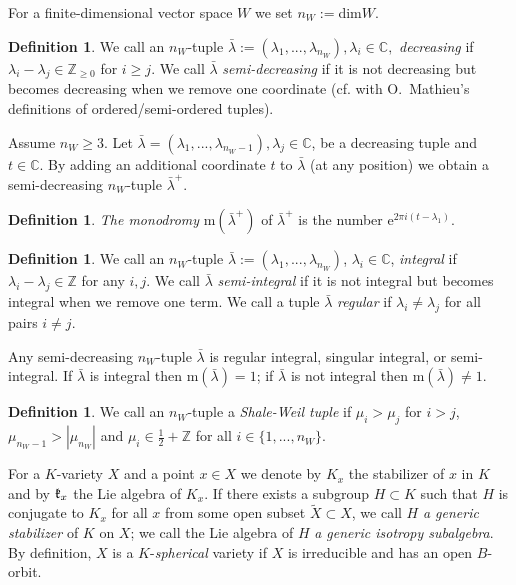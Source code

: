 \documentclass[12pt]{amsart}
\theoremstyle{definition}\newtheorem{theorem}{Theorem}[section]
\theoremstyle{definition}\newtheorem{definition}[proposition]{Definition}
\theoremstyle{remark}\newtheorem{example}[proposition]{Example}
\begin{document}
For a finite-dimensional vector space $W$ we set $n_W:=$dim$W$.
\begin{definition} We call an $n_W$-tuple $\bar\lambda:=(\lambda_1,..., \lambda_{n_W}), \lambda_i\in\mathbb C,$ {\it decreasing} if $\lambda_i-\lambda_j\in\mathbb Z_{\ge0}$ for $i\ge j$. We call $\bar\lambda$ {\it semi-decreasing} if it is not decreasing but becomes decreasing when we remove one coordinate (cf. with O.~Mathieu's~\cite{M} definitions of ordered/semi-ordered tuples).\end{definition}
Assume $n_W\ge 3$. Let $\bar\lambda=(\lambda_1,..., \lambda_{n_W-1}), \lambda_j\in\mathbb C$, be a decreasing tuple and $t\in\mathbb C$. By adding an additional coordinate $t$ to $\bar\lambda$ (at any position) we obtain a semi-decreasing $n_W$-tuple $\bar\lambda^+$.
\begin{definition}{\it The monodromy} m$(\bar\lambda^+)$ of $\bar\lambda^+$ is the number e$^{2\pi i(t-\lambda_1)}$.\end{definition}
\begin{definition} We call an $n_W$-tuple $\bar\lambda:=(\lambda_1, ..., \lambda_{n_W})$, $\lambda_i\in\mathbb C$, {\it integral} if $\lambda_i-\lambda_j\in\mathbb Z$ for any $i, j$. We call $\bar\lambda$ {\it semi-integral} if it is not integral but becomes integral when we remove one term. We call a tuple $\bar\lambda$ {\it regular} if $\lambda_i\ne\lambda_j$ for all pairs $i\ne j$.\end{definition}
Any semi-decreasing $n_W$-tuple $\bar\lambda$ is regular integral, singular integral, or semi-integral. If $\bar\lambda$ is integral then m$(\bar\lambda)=1$; if $\bar\lambda$ is not integral then m$(\bar\lambda)\ne1$.

\begin{definition} We call an $n_W$-tuple a {\it Shale-Weil tuple} if $\mu_i>\mu_j$ for $i>j$, $\mu_{n_W-1}>|\mu_{n_W}|$ and $\mu_i\in\frac{1}{2}+\mathbb Z$ for all $i\in\{1,...,n_W\}$.\end{definition}
For a $K$-variety $X$ and a point $x\in X$ we denote by $K_x$ the stabilizer of $x$ in $K$ and by $\frak k_x$ the Lie algebra of $K_x$. If there exists a subgroup $H\subset K$ such that $H$ is conjugate to $K_x$ for all $x$ from some open subset $\tilde X\subset X$, we call $H$ {\it a generic stabilizer} of $K$ on $X$; we call the Lie algebra of $H$ {\it a generic isotropy subalgebra}. By definition, $X$ is a $K$-{\it spherical} variety if $X$ is irreducible and has an open $B$-orbit.
\end{document}
